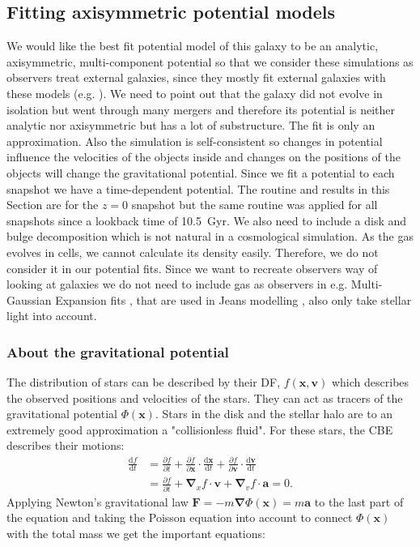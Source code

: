 \subsection{Fitting axisymmetric potential models}\label{subsec:best_fit_pot}
We would like the best fit potential model of this galaxy to be an analytic, axisymmetric, multi-component potential so that we consider these simulations as observers treat external galaxies, since they mostly fit external galaxies with these models (e.g. \citealp{Geehan...Andromedapot...2006}). We need to point out that the galaxy did not evolve in isolation but went through many mergers and therefore its potential is neither analytic nor axisymmetric but has a lot of substructure. The fit is only an approximation. Also the simulation is self-consistent so changes in potential influence the velocities of the objects inside and changes on the positions of the objects will change the gravitational potential. Since we fit a potential to each snapshot we have a time-dependent potential. The routine and results in this Section are for the $z=0$ snapshot but the same routine was applied for all snapshots since a lookback time of \SI{10.5}{Gyr}. We also need to include a disk and bulge decomposition which is not natural in a cosmological simulation. As the gas evolves in cells, we cannot calculate its density easily. Therefore, we do not consider it in our potential fits. Since we want to recreate observers way of looking at galaxies we do not need to include gas as observers in e.g. Multi-Gaussian Expansion fits \citep{MGE...Monnet, MGE...Emsellem}, that are used in Jeans modelling \citep{Cappellari...Jeans....2008, Glenn....einsteincross...2010}, also only take stellar light into account. 

\subsubsection{About the gravitational potential}\label{subsubsec:pot_theory}
The distribution of stars can be described by their \ac{DF}, $f(\mathbf{x}, \mathbf{v})$ which describes the observed positions and velocities of the stars. They can act as tracers of the gravitational potential $\Phi(\mathbf{x})$. Stars in the disk and the stellar halo are to an extremely good approximation a "collisionless fluid". For these stars, the \ac{CBE} describes their motions: 
\begin{align}\label{eq:CBE}
    \frac{\mathrm{d}f}{\mathrm{d}t} &= \frac{\partial f}{\partial t} + \frac{\partial f}{\partial \mathbf{x}} \cdot \frac{\mathrm{d}\mathbf{x}}{\mathrm{d}t} + \frac{\partial f}{\partial \mathbf{v}} \cdot \frac{\mathrm{d}\mathbf{v}}{\mathrm{d}t}\\
    &= \frac{\partial f}{\partial t} + \bm{\nabla}_x f \cdot \mathbf{v} + \bm{\nabla}_v f \cdot \mathbf{a} = 0.
\end{align}
Applying Newton's gravitational law $\mathbf{F} = -m\bm{\nabla}\Phi(\mathbf{x}) = m\mathbf{a}$ to the last part of the equation and taking the Poisson equation into account to connect $\Phi(\mathbf{x})$ with the total mass we get the important equations:


